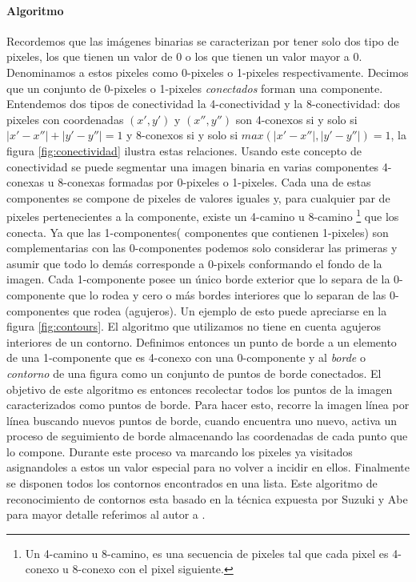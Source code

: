 	\paragraph{Algoritmo} 
	Recordemos que las imágenes binarias se caracterizan por tener solo 
	dos tipo de pixeles, los que tienen un valor de 0 o los que tienen 
	un valor mayor a 0. Denominamos a estos pixeles como 
	0-pixeles o 1-pixeles respectivamente. Decimos que un conjunto de 0-pixeles o 1-pixeles \textit{conectados} forman una componente. Entendemos dos tipos de conectividad
	la 4-conectividad y la 8-conectividad: dos pixeles con coordenadas $(x',y')$ y $(x'',y'')$ son 4-conexos si y solo si 
	$|x' - x''| + |y'-y''| = 1$ y 8-conexos si y solo si $max(|x'-x''|,|y'-y''|)=1$, la figura \ref{fig:conectividad} ilustra estas relaciones.
	Usando este concepto de conectividad se puede segmentar una imagen 
	binaria en varias componentes 4-conexas u 8-conexas formadas por 
	 0-pixeles o 1-pixeles. Cada una de estas
	componentes se compone de pixeles de valores iguales y, para cualquier 
	par de pixeles pertenecientes a la componente, existe un 
	4-camino u 8-camino \footnote{ Un 4-camino u 8-camino, es una secuencia 
	de pixeles tal que cada pixel es 4-conexo u 8-conexo con el pixel 
	siguiente.} que los
	conecta. Ya que las 1-componentes( componentes que contienen 1-pixeles) son complementarias con las 0-componentes podemos solo considerar las primeras y asumir que todo
	lo demás corresponde a 0-pixels conformando el fondo de la imagen. Cada 
	1-componente posee un único borde exterior que lo separa de la 0-componente que lo rodea y cero o más bordes interiores que lo separan de las 0-componentes que rodea (agujeros). Un ejemplo de esto puede apreciarse
	en la figura \ref{fig:contours}. El algoritmo que utilizamos no tiene en cuenta agujeros interiores de un contorno. Definimos entonces un punto de borde a un elemento de una 1-componente que es 4-conexo con una 0-componente y al \textit{borde} o \textit{contorno} de una figura como un conjunto de puntos de borde conectados. 
	El objetivo de este algoritmo es entonces recolectar todos los 
	puntos de la imagen caracterizados como puntos de borde. Para 
	hacer esto, recorre la imagen línea por línea buscando nuevos puntos de borde, cuando encuentra
	uno nuevo, activa un proceso de seguimiento de borde almacenando las 
	coordenadas de cada punto que lo compone. Durante este proceso va 
	marcando los pixeles ya 
	visitados asignandoles a estos un valor especial para no volver a 
	incidir en ellos. Finalmente se disponen todos los contornos encontrados en una lista.
	Este algoritmo de reconocimiento de contornos esta basado en la 
	técnica expuesta por Suzuki y Abe para mayor detalle referimos al 
	autor a \cite{suzuki85}.
	
